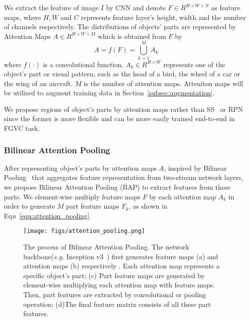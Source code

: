 \documentclass[10pt,twocolumn,letterpaper]{article}
\def\eg{{\em e.g. }}
\begin{document}
We extract the feature of image $I$ by CNN and denote $F\in R^{H\times W \times N}$ as feature maps, where $H,W$ and $C$ represents feature layer's height, width and the number of channels respectively. The distributions of objects' parts are represented by Attention Maps $A\in R^{H\times W \times M}$ which is obtained from $F$ by
\begin{equation}
    A = f(F) =\bigcup_{k=1}^{M} A_k
\end{equation}
 where $f(\cdot)$ is a convolutional function. $A_k \in R^{H\times W}$ represents one of the object's part or visual pattern, such as the head of a bird, the wheel of a car or the wing of an aircraft. $M$ is the number of attention maps. Atteniton maps will be utilized to augment training data in Section~\ref{subsec:augmentation}.

 We propose regions of object's parts by attention maps rather than SS~\cite{ss} or RPN~\cite{faster-rcnn} since the former is more flexible and can be more easily trained end-to-end in FGVC task.

\subsubsection{Bilinear Attention Pooling}
After representing object's parts by attention maps $A$, inspired by Bilinear Pooling~\cite{bcnn} that aggregates feature representation from two-stream network layers, we propose Bilinear Attention Pooling (BAP) to extract features from these parts. We element-wise multiply feature maps $F$ by each attention map $A_k$ in order to generate $M$ part feature maps $F_k$, as shown in Equ~\ref{equ:attention_pooling}.

\begin{figure}[h]
    \begin{center}
        \texttt{[image: figs/attention\_pooling.png]}
    \end{center}
    \caption{\small The process of Bilinear Attention Pooling. The network backbone(\eg Inception v3~\cite{inception}) first generates feature maps (a) and attention maps (b) respectively . Each attention map represents a specific object's part; (c) Part feature maps are generated by element-wise multiplying each attention map with feature maps. Then, part features are extracted by convolutional or pooling operation; (d)The final feature matrix consists of all these part features.}
    \label{fig:attention_pooling}
\end{figure}
\end{document}
